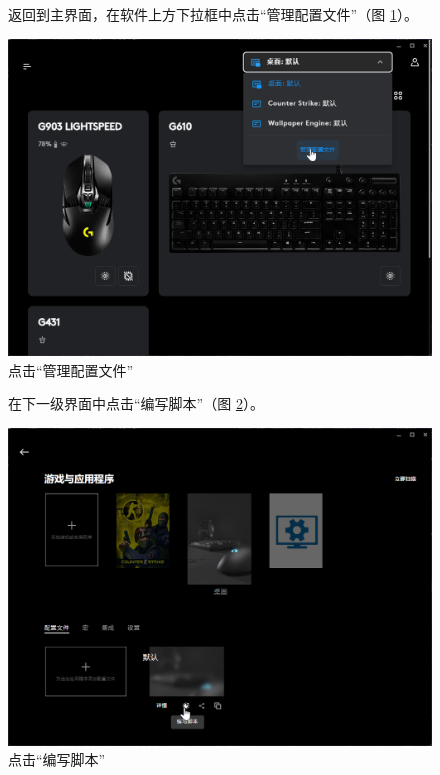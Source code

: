 \begin{figure}[H]
    \Centering
    \parbox[l]{\textwidth}{返回到主界面，在软件上方下拉框中点击“管理配置文件”（图 \ref{ch0fig-manage-configs}）。}
    \includegraphics[width=\textwidth]{docs/assets/intro/manage_configs.png}
    \caption{点击“管理配置文件”}
    \label{ch0fig-manage-configs}
\end{figure}

\begin{figure}[H]
    \Centering
    \parbox[l]{\textwidth}{在下一级界面中点击“编写脚本”（图 \ref{ch0fig-script}）。}
    \includegraphics[width=\textwidth]{docs/assets/intro/script.png}
    \caption{点击“编写脚本”}
    \label{ch0fig-script}
\end{figure}

